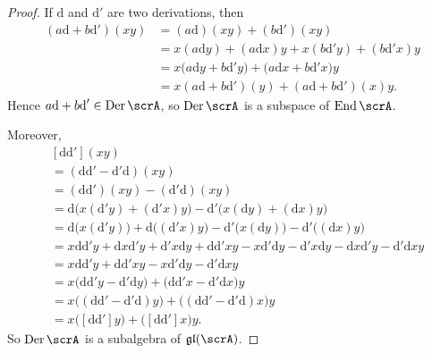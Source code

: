 \documentclass{article}
\newcommand{\lb}[1]{\ensuremath{\left[{#1}\right]}}
\DeclareMathOperator{\End}{End}
\DeclareMathOperator{\Der}{Der}
\newcommand{\dd}{\ensuremath{\text{d}}}
\newcommand*\glalg{\ensuremath{\mathfrak{gl}}}
\begin{document}
\begin{proof}
    If $\dd$ and $\dd'$ are two derivations, then
    \begin{align*}
        (a\dd + b\dd')(xy)
        &=
        (a\dd)(xy) + (b\dd')(xy)
        \\
        &=
        x(a\dd y) + (a\dd x)y
        +
        x(b\dd'y) + (b\dd'x)y
        \\
        &=
        x
        \Big(
            a\dd y + b\dd'y
        \Big)
        +
        \Big(
            a\dd x + b\dd'x
        \Big)
        y
        \\
        &=
        x(a\dd + b\dd')(y)
        +
        (a\dd + b\dd')(x)y.
    \end{align*}
    Hence $a\dd + b\dd' \in \Der \scrA$, so $\Der \scrA$ is a subspace of $\End \scrA$.

    Moreover, 
    \begin{align*}
        &\lb{\dd\dd'}(xy)
        \\
        &=
        (\dd\dd' - \dd'\dd)(xy)
        \\
        &=
        (\dd\dd')(xy) - (\dd'\dd)(xy)
        \\
        &=
        \dd
        \Big(
            x(\dd'y) + (\dd'x)y
        \Big)
        -
        \dd'
        \Big(
            x(\dd y) + (\dd x)y
        \Big)
        \\
        &=
        \dd\Big(x(\dd'y)\Big) 
        +
        \dd\Big((\dd'x)y\Big) 
        -
        \dd'\Big(x(\dd y)\Big) 
        -
        \dd'\Big((\dd x)y\Big) 
        \\
        &=
        x\dd\dd'y
        +
        \dd x \dd' y
        +
        \dd'x \dd y
        +
        \dd\dd'x y
        -
        x\dd'\dd y
        -
        \dd' x \dd y
        -
        \dd x \dd' y
        -
        \dd' \dd x y
        \\
        &=
        x\dd\dd'y
        +
        \dd\dd'x y
        -
        x\dd'\dd y
        -
        \dd' \dd x y
        \\
        &=
        x
        \Big(
            \dd\dd'y - \dd'\dd y
        \Big)
        +
        \Big(
            \dd\dd'x - \dd'\dd x 
        \Big)
        y
        \\
        &=
        x\Big((\dd\dd' - \dd'\dd)y\Big)
        +
        \Big((\dd\dd' - \dd'\dd)x\Big)y
        \\
        &=
        x\Big(\lb{\dd\dd'}y\Big)
        +
        \Big(\lb{\dd\dd'}x\Big)y.
    \end{align*}
    So $\Der \scrA$ is a subalgebra of $\glalg(\scrA)$.
\end{proof}
\end{document}
